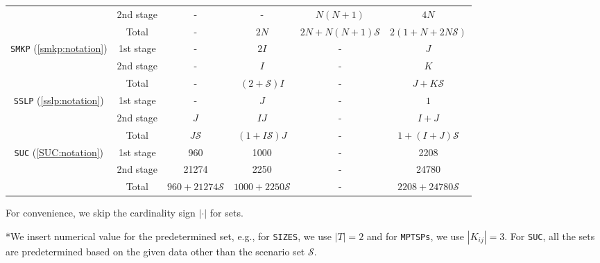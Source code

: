 \begin{table}[H]
{\begin{threeparttable}
\begin{tabular}{@{}cccccc@{}}
				& 2nd stage & -              & -                                  & $N(N+1)$              & $4N$                     \\ \cmidrule(l){2-6} 
				& Total          & -              & $2N$                               & $2N+N(N+1)\mathcal{S}$ & $2(1+N+2N\mathcal{S})$    \\ \midrule
				\multirow{3}{*}{\texttt{SMKP} (\ref{smkp:notation})}   & 1st stage & -              & $2I$                               & -                    & $J$                       \\
				& 2nd stage & -              & $I$                                & -                    & $K$                       \\ \cmidrule(l){2-6} 
				& Total          & -              & $(2+\mathcal{S})I$                 & -                    & $J+K\mathcal{S}$          \\ \midrule
				\multirow{3}{*}{\texttt{SSLP} (\ref{sslp:notation})}   & 1st stage & -              & $J$                                & -                    & $1$                       \\
				& 2nd stage & $J$            & $IJ$                               & -                    & $I+J$                     \\ \cmidrule(l){2-6} 
				& Total          & $J\mathcal{S}$ & $(1+I\mathcal{S})J$                & -                    & $1+(I+J)\mathcal{S}$      \\ \midrule
				\multirow{3}{*}{\texttt{SUC} (\ref{SUC:notation})}   & 1st stage & 960               &   1000                                 &     -                 &  2208                         \\
				& 2nd stage & 21274               &     2250                               &   -                   & 24780                          \\ \cmidrule(l){2-6} 
				& Total          & $960+21274\mathcal{S}$                &  $1000+2250\mathcal{S}$                                  &  -                    &  $2208+24780\mathcal{S}$                         \\ \bottomrule
			\end{tabular}
			
			\begin{tablenotes}
				\small
				\item *For convenience, we skip the cardinality sign $|\cdot|$ for sets.
				\item **We insert numerical value for the predetermined set, e.g., for \texttt{SIZES}, we use $|T|=2$ and for \texttt{MPTSPs}, we use $|K_{ij}|=3$. For \texttt{SUC}, all the sets are predetermined based on the given data other than the scenario set $\mathcal{S}$.
			\end{tablenotes}
		\end{threeparttable}
	}
\end{table}

